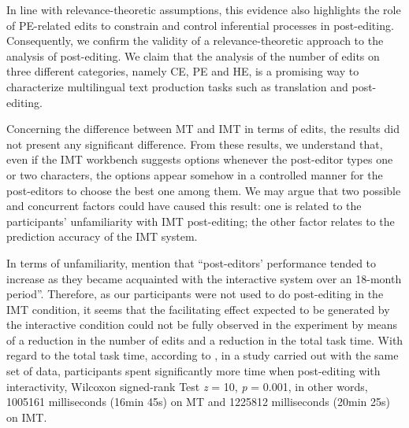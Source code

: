 \documentclass[output=paper]{langsci/langscibook}
\begin{document}
In line with relevance-theoretic assumptions, this evidence also highlights the role of PE-related edits to constrain and control inferential processes in post-editing.  Consequently, we confirm the validity of a relevance-theoretic approach to the analysis of post-editing. We claim that the analysis of the number of edits on three different categories, namely CE, PE and HE, is a promising way to characterize multilingual text production tasks such as translation and post-editing.  



Concerning the difference between MT and IMT in terms of edits, the results did not present any significant difference.  From these results, we understand that, even if the IMT workbench suggests options whenever the post-editor types one or two characters, the options appear somehow in a controlled manner for the post-editors to choose the best one among them. We may argue that two possible and concurrent factors could have caused this result: one is related to the participants' unfamiliarity with IMT post-editing; the other factor relates to the prediction accuracy of the IMT system.  



In terms of unfamiliarity, \citet[553]{Underwood2014} mention that ``post-editors' performance tended to increase as they became acquainted with the interactive system over an 18-month period''.  Therefore, as our participants were not used to do post-editing in the IMT condition, it seems that the facilitating effect expected to be generated by the interactive condition could not be fully observed in the experiment by means of a reduction in the number of edits and a reduction in the total task time. With regard to the total task time, according to \citet{alves2015}, in a study carried out with the same set of data, participants spent significantly more time when post-editing with interactivity, Wilcoxon signed-rank Test \textit{z} = 10, \textit{p} = 0.001, in other words, 1005161 milliseconds (16min 45s) on MT and 1225812 milliseconds (20min 25s) on IMT. 
\end{document}
